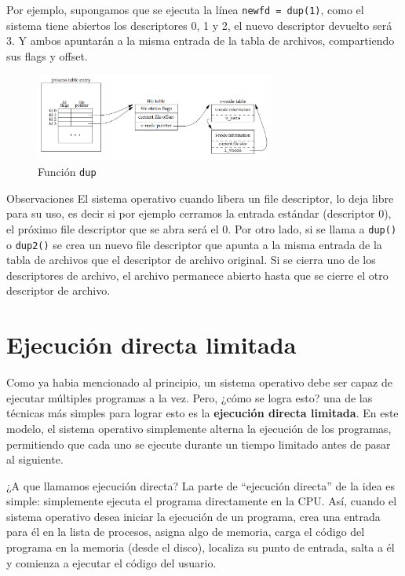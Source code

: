 \documentclass{article}
\begin{document}
Por ejemplo, supongamos que se ejecuta la línea \texttt{newfd = dup(1)}, como el sistema tiene abiertos los descriptores 0, 1 y 2, el nuevo descriptor devuelto será 3. Y ambos apuntarán a la misma entrada de la tabla de archivos, compartiendo sus flags y offset.

\begin{figure}[h]
    \centering
    \includegraphics[width=0.7\textwidth]{src/dupdata.png}
    \caption{Función \texttt{dup}}
\end{figure}

\begin{summary}{Observaciones}
    El sistema operativo cuando libera un file descriptor, lo deja libre para su uso, es decir si por ejemplo cerramos la entrada estándar (descriptor 0), el próximo file descriptor que se abra será el 0. Por otro lado, si se llama a \texttt{dup()} o \texttt{dup2()} se crea un nuevo file descriptor que apunta a la misma entrada de la tabla de archivos que el descriptor de archivo original. Si se cierra uno de los descriptores de archivo, el archivo permanece abierto hasta que se cierre el otro descriptor de archivo.
\end{summary}


\newpage
\section{Ejecución directa limitada}

Como ya habia mencionado al principio, un sistema operativo debe ser capaz de ejecutar múltiples programas a la vez. Pero, ¿cómo se logra esto? una de las técnicas más simples para lograr esto es la \textbf{ejecución directa limitada}. En este modelo, el sistema operativo simplemente alterna la ejecución de los programas, permitiendo que cada uno se ejecute durante un tiempo limitado antes de pasar al siguiente.

¿A que llamamos ejecución directa? La parte de “ejecución directa” de la idea es simple: simplemente ejecuta el programa directamente en la CPU. Así, cuando el sistema operativo desea iniciar la ejecución de un programa, crea una entrada para él en la lista de procesos, asigna algo de memoria, carga el código del programa en la memoria (desde el disco), localiza su punto de entrada, salta a él y comienza a ejecutar el código del usuario.
\end{document}
